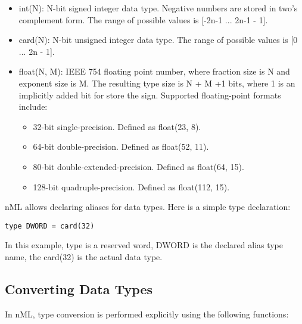 \documentclass[oneside,final,14pt]{extreport}
\begin{document}
\begin{itemize}

\item int(N): N-bit signed integer data type. Negative numbers are stored in two's 
complement form. The range of possible values is [-2n-1 ... 2n-1 - 1].

\item card(N): N-bit unsigned integer data type. The range of possible values is [0 ... 2n - 1].

\item float(N, M): IEEE 754 floating point number, where fraction size is N and exponent size is M.
The resulting type size is N + M +1 bits, where 1 is an implicitly added bit for store the sign.
Supported floating-point formats include:

\begin{itemize}
\item 32-bit single-precision. Defined as float(23, 8).
\item 64-bit double-precision. Defined as float(52, 11).
\item 80-bit double-extended-precision. Defined as float(64, 15).
\item 128-bit quadruple-precision. Defined as float(112, 15).
\end{itemize}

\end{itemize}

nML allows declaring aliases for data types. Here is a simple type declaration:

\begin{lstlisting}
type DWORD = card(32)
\end{lstlisting}

In this example, type is a reserved word, DWORD is the declared alias type name, the card(32) is
the actual data type.

\subsection{Converting Data Types}

In nML, type conversion is performed explicitly using the following functions:
\end{document}
